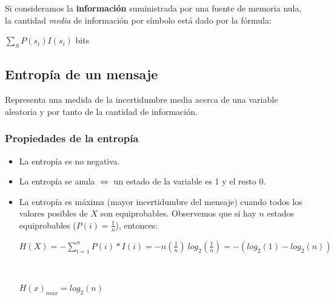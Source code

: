 \documentclass[]{article}
\begin{document}
Si consideramos la \textbf{información} suministrada por una fuente de memoria nula, la cantidad \emph{media} de información por símbolo está dado por la fórmula:
\begin{center}
    $\displaystyle \sum_S P(s_i) I(s_i)$ bits
\end{center}


\subsection{Entropía de un mensaje}

Representa una medida de la incertidumbre media acerca de una variable aleatoria y por tanto de la cantidad de información.

\subsubsection{Propiedades de la entropía}
\begin{itemize}
    \item La entropía es no negativa.
    \item La entropía se anula $\Leftrightarrow$ un estado de la variable es 1 y el resto 0.
    \item La entropía es máxima (mayor incertidumbre del mensaje) cuando todos los  valores posibles de $X$ son equiprobables. Observemos que si hay $n$ estados equiprobables ($P(i) = \frac{1}{n}$), entonces:
    \begin{center}
        $\displaystyle H(X) = -\sum_{i=1}^n P(i)*I(i) = -n \left(\frac{1}{n}\right)\ log_2\left(\frac{1}{n}\right) = - (log_2(1) - log_2(n))$
    \end{center}
~\newline
    \begin{center}
        $H(x)_{max} = log_2(n)$
    \end{center}
\end{itemize}
\end{document}
